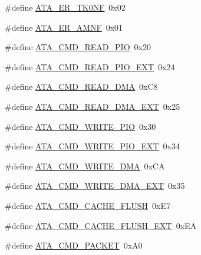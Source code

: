 \begin{DoxyCompactItemize}
\item 
\#define \hyperlink{a00032_aaffca74832da09d4cf0ea68624546c91_aaffca74832da09d4cf0ea68624546c91}{A\+T\+A\+\_\+\+E\+R\+\_\+\+T\+K0\+NF}~0x02
\item 
\#define \hyperlink{a00032_ac4f0c06f285d99068cbad7b6d4641d1f_ac4f0c06f285d99068cbad7b6d4641d1f}{A\+T\+A\+\_\+\+E\+R\+\_\+\+A\+M\+NF}~0x01
\item 
\#define \hyperlink{a00032_a91a96db8427a8caa254a218f05dcb3f4_a91a96db8427a8caa254a218f05dcb3f4}{A\+T\+A\+\_\+\+C\+M\+D\+\_\+\+R\+E\+A\+D\+\_\+\+P\+IO}~0x20
\item 
\#define \hyperlink{a00032_a3165497b4d8eb30297a4d62e39846b01_a3165497b4d8eb30297a4d62e39846b01}{A\+T\+A\+\_\+\+C\+M\+D\+\_\+\+R\+E\+A\+D\+\_\+\+P\+I\+O\+\_\+\+E\+XT}~0x24
\item 
\#define \hyperlink{a00032_aefab351e75e10b6dbfa0b7828031cda4_aefab351e75e10b6dbfa0b7828031cda4}{A\+T\+A\+\_\+\+C\+M\+D\+\_\+\+R\+E\+A\+D\+\_\+\+D\+MA}~0x\+C8
\item 
\#define \hyperlink{a00032_a42247550c708b2b7852927180c7dde78_a42247550c708b2b7852927180c7dde78}{A\+T\+A\+\_\+\+C\+M\+D\+\_\+\+R\+E\+A\+D\+\_\+\+D\+M\+A\+\_\+\+E\+XT}~0x25
\item 
\#define \hyperlink{a00032_a64f2c50b916f1f67018c36f75f811cc7_a64f2c50b916f1f67018c36f75f811cc7}{A\+T\+A\+\_\+\+C\+M\+D\+\_\+\+W\+R\+I\+T\+E\+\_\+\+P\+IO}~0x30
\item 
\#define \hyperlink{a00032_ac8e433782c7125e6929673907eca6f17_ac8e433782c7125e6929673907eca6f17}{A\+T\+A\+\_\+\+C\+M\+D\+\_\+\+W\+R\+I\+T\+E\+\_\+\+P\+I\+O\+\_\+\+E\+XT}~0x34
\item 
\#define \hyperlink{a00032_a41dc931ac3c2c6733a2a67d03eaf1674_a41dc931ac3c2c6733a2a67d03eaf1674}{A\+T\+A\+\_\+\+C\+M\+D\+\_\+\+W\+R\+I\+T\+E\+\_\+\+D\+MA}~0x\+CA
\item 
\#define \hyperlink{a00032_a3a75d9e39518e704f3a4b39e6a3d998c_a3a75d9e39518e704f3a4b39e6a3d998c}{A\+T\+A\+\_\+\+C\+M\+D\+\_\+\+W\+R\+I\+T\+E\+\_\+\+D\+M\+A\+\_\+\+E\+XT}~0x35
\item 
\#define \hyperlink{a00032_a23e8deb17b95336898b52cc76d5206af_a23e8deb17b95336898b52cc76d5206af}{A\+T\+A\+\_\+\+C\+M\+D\+\_\+\+C\+A\+C\+H\+E\+\_\+\+F\+L\+U\+SH}~0x\+E7
\item 
\#define \hyperlink{a00032_a3c624c2041a51a473bd6e77b7753d475_a3c624c2041a51a473bd6e77b7753d475}{A\+T\+A\+\_\+\+C\+M\+D\+\_\+\+C\+A\+C\+H\+E\+\_\+\+F\+L\+U\+S\+H\+\_\+\+E\+XT}~0x\+EA
\item 
\#define \hyperlink{a00032_afaaead63f9b69425b9f6514b03f0bbb2_afaaead63f9b69425b9f6514b03f0bbb2}{A\+T\+A\+\_\+\+C\+M\+D\+\_\+\+P\+A\+C\+K\+ET}~0x\+A0

\end{DoxyCompactItemize}
